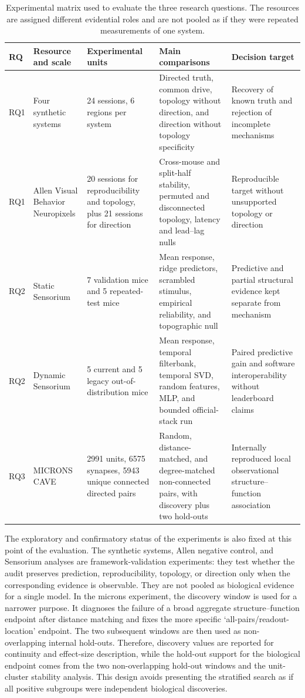 \begin{table}[t]
\centering
\caption{Experimental matrix used to evaluate the three research questions. The
resources are assigned different evidential roles and are not pooled as if they
were repeated measurements of one system.}
\label{tab:experimental-matrix}
\scriptsize
\begin{tabularx}{\textwidth}{@{}p{0.8cm}p{2.6cm}p{2.7cm}X X@{}}
\toprule
RQ & Resource and scale & Experimental units & Main comparisons & Decision target \\
\midrule
RQ1 & Four synthetic systems & 24 sessions, 6 regions per system & Directed truth, common drive, topology without direction, and direction without topology specificity & Recovery of known truth and rejection of incomplete mechanisms \\
RQ1 & Allen Visual Behavior Neuropixels & 20 sessions for reproducibility and topology, plus 21 sessions for direction & Cross-mouse and split-half stability, permuted and disconnected topology, latency and lead--lag nulls & Reproducible target without unsupported topology or direction \\
RQ2 & Static Sensorium & 7 validation mice and 5 repeated-test mice & Mean response, ridge predictors, scrambled stimulus, empirical reliability, and topographic null & Predictive and partial structural evidence kept separate from mechanism \\
RQ2 & Dynamic Sensorium & 5 current and 5 legacy out-of-distribution mice & Mean response, temporal filterbank, temporal SVD, random features, MLP, and bounded official-stack run & Paired predictive gain and software interoperability without leaderboard claims \\
RQ3 & MICRONS CAVE & 2991 units, 6575 synapses, 5943 unique connected directed pairs & Random, distance-matched, and degree-matched non-connected pairs, with discovery plus two hold-outs & Internally reproduced local observational structure--function association \\
\bottomrule
\end{tabularx}
\end{table}


The exploratory and confirmatory status of the experiments is also fixed at this
point of the evaluation. The synthetic systems, Allen negative control, and
Sensorium analyses are framework-validation experiments: they test whether the
audit preserves prediction, reproducibility, topology, or direction only when the
corresponding evidence is observable. They are not pooled as biological evidence
for a single model. In the \acs{microns} experiment, the discovery window is used
for a narrower purpose. It diagnoses the failure of a broad aggregate
structure--function endpoint after distance matching and fixes the more specific
`all-pairs/readout-location' endpoint. The two subsequent windows are then used
as non-overlapping internal hold-outs. Therefore, discovery values are reported
for continuity and effect-size description, while the hold-out support for
the biological endpoint comes from the two non-overlapping hold-out windows and
the unit-cluster stability analysis. This design avoids presenting the stratified
search as if all positive subgroups were independent biological discoveries.

